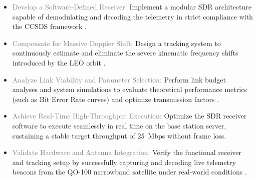 \begin{itemize}
    \item \textcolor{gray}{Develop a Software-Defined Receiver:} Implement a modular SDR architecture capable of demodulating and decoding the telemetry in strict compliance with the CCSDS framework \autocite{CCSDS_131_0_B_5, CCSDS_132_0_B_3, gr_satellites, gr_highdatarate_modem}.
    \item \textcolor{gray}{Compensate for Massive Doppler Shift:} Design a tracking system to continuously estimate and eliminate the severe kinematic frequency shifts introduced by the LEO orbit \autocite{ali1998doppler, dopplergnuradio, gr_gpredict_doppler}.
    \item \textcolor{gray}{Analyze Link Viability and Parameter Selection:} Perform link budget analyses and system simulations to evaluate theoretical performance metrics (such as Bit Error Rate curves) and optimize transmission factors \autocite{CCSDS_130_1_G_3, Maral2009}.
    \item \textcolor{gray}{Achieve Real-Time High-Throughput Execution:} Optimize the SDR receiver software to execute seamlessly in real time on the base station server, sustaining a stable target throughput of 25~Mbps without frame loss.
    \item \textcolor{gray}{Validate Hardware and Antenna Integration:} Verify the functional receiver and tracking setup by successfully capturing and decoding live telemetry beacons from the QO-100 narrowband satellite under real-world conditions \autocite{LNB_Manual}.
\end{itemize}
